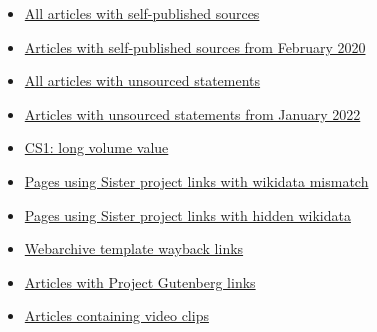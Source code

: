 \documentclass[11pt,a4paper]{article}
\begin{document}
\begin{itemize}
\item \href{/wiki/Category:All\_articles\_with\_self-published\_sources}{All articles with self-published sources}
\item \href{/wiki/Category:Articles\_with\_self-published\_sources\_from\_February\_2020}{Articles with self-published sources from February 2020}
\item \href{/wiki/Category:All\_articles\_with\_unsourced\_statements}{All articles with unsourced statements}
\item \href{/wiki/Category:Articles\_with\_unsourced\_statements\_from\_January\_2022}{Articles with unsourced statements from January 2022}
\item \href{/wiki/Category:CS1:\_long\_volume\_value}{CS1: long volume value}
\item \href{/wiki/Category:Pages\_using\_Sister\_project\_links\_with\_wikidata\_mismatch}{Pages using Sister project links with wikidata mismatch}
\item \href{/wiki/Category:Pages\_using\_Sister\_project\_links\_with\_hidden\_wikidata}{Pages using Sister project links with hidden wikidata}
\item \href{/wiki/Category:Webarchive\_template\_wayback\_links}{Webarchive template wayback links}
\item \href{/wiki/Category:Articles\_with\_Project\_Gutenberg\_links}{Articles with Project Gutenberg links}
\item \href{/wiki/Category:Articles\_containing\_video\_clips}{Articles containing video clips}
\end{itemize}
\end{document}
